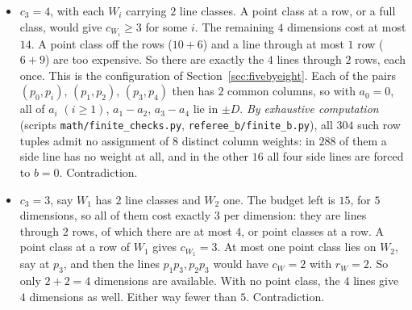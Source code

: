\documentclass[11pt,a4paper]{article}
\theoremstyle{plain}
\theoremstyle{definition}
\newcommand{\scr}[1]{\nolinkurl{#1}}
\begin{document}
\begin{itemize}
\item $c_{3}=4$, with each $W_{i}$ carrying $2$ line classes. A point class at a row, or a full class, would give $c_{W_{i}}\ge3$ for some $i$. The remaining $4$ dimensions cost at most $14$. A point class off the rows ($10+6$) and a line through at most $1$ row ($6+9$) are too expensive. So there are exactly the $4$ lines through $2$ rows, each once. This is the configuration of Section~\ref{sec:fivebyeight}. Each of the pairs $(p_{0},p_{i})$, $(p_{1},p_{2})$, $(p_{3},p_{4})$ then has $2$ common columns, so with $a_{0}=0$, all of $a_{i}$ $(i\ge1)$, $a_{1}-a_{2}$, $a_{3}-a_{4}$ lie in $\pm D$. \emph{By exhaustive computation} (scripts \scr{math/finite_checks.py}, \scr{referee_b/finite_b.py}), all $304$ such row tuples admit no assignment of $8$ distinct column weights: in $288$ of them a side line has no weight at all, and in the other $16$ all four side lines are forced to $b=0$. Contradiction.
\item $c_{3}=3$, say $W_{1}$ has $2$ line classes and $W_{2}$ one. The budget left is $15$, for $5$ dimensions, so all of them cost exactly $3$ per dimension: they are lines through $2$ rows, of which there are at most $4$, or point classes at a row. A point class at a row of $W_{1}$ gives $c_{W_{1}}=3$. At most one point class lies on $W_{2}$, say at $p_{3}$, and then the lines $p_{1}p_{3},p_{2}p_{3}$ would have $c_{W}=2$ with $r_{W}=2$. So only $2+2=4$ dimensions are available. With no point class, the $4$ lines give $4$ dimensions as well. Either way fewer than $5$. Contradiction.
\end{itemize}
\end{document}
